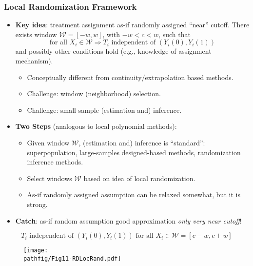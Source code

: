 \documentclass[9pt]{beamer}
\renewcommand{\c}{c}
\newcommand{\W}{\mathcal{W}}
\newcommand{\pathfig}{figures}
\begin{document}
\begin{frame}\frametitle{Local Randomization Framework}
	\begin{itemize}
		\item \textbf{Key idea}: treatment assignment as-if randomly assigned ``near'' cutoff.\newline
		There exists window $\W=[-w,w]$, with $-w<\c<w$, such that
		\[\text{for all }X_{i}\in \W\Longrightarrow T_{i}\text{ independent of }	(Y_{i}(0),Y_{i}(1))\]
		and possibly other conditions hold (e.g., knowledge of assignment mechanism).\medskip
		\begin{itemize}
			\item Conceptually different from continuity/extrapolation based methods.\medskip
			\item Challenge: window (neighborhood) selection.\medskip
			\item Challenge: small sample (estimation and) inference.\bigskip
		\end{itemize}
		
		\item \textbf{Two Steps} (analogous to local polynomial methods):\medskip
		\begin{itemize}
			\item Given window $\W$, (estimation and) inference is ``standard'': superpopulation, large-samples designed-based methods, randomization inference methods.\medskip
			\item Select windows $\W$ based on idea of local randomization.\medskip
			\item As-if randomly assigned assumption can be relaxed somewhat, but it is strong.\bigskip
		\end{itemize}
		
		\item \textbf{Catch}: as-if random assumption good approximation \textit{only very near cutoff}!\bigskip
		
	\end{itemize}
\end{frame}

\begin{frame}
	\[ T_i \text{ independent of } (Y_i(0),Y_i(1)) \text{ for all } X_i\in\W=[\c-w,c+w] \]
	\begin{figure}
		\vspace{-0.1in}
		\centering
		\texttt{[image: \\pathfig/Fig11-RDLocRand.pdf]}
	\end{figure}
\end{frame}
\end{document}
